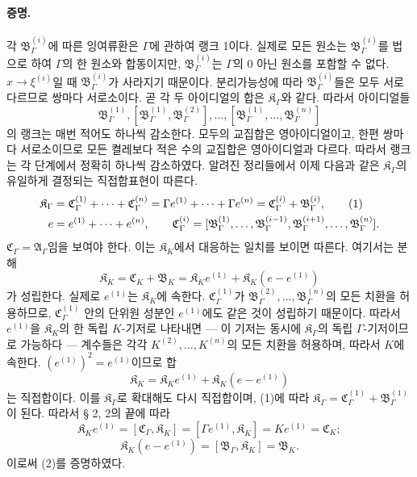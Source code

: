 \paragraph{증명.}
각 \(\mathfrak B_\Gamma^{(i)}\)에 따른 잉여류환은 \(\Gamma\)에 관하여 랭크 1이다. 실제로 모든 원소는 \(\mathfrak B_\Gamma^{(i)}\)를 법으로 하여 \(\Gamma\)의 한 원소와 합동이지만, \(\mathfrak B_\Gamma^{(i)}\)는 \(\Gamma\)의 0 아닌 원소를 포함할 수 없다. \(x\to\xi^{(i)}\)일 때 \(\mathfrak B_\Gamma^{(i)}\)가 사라지기 때문이다. 분리가능성에 따라 \(\mathfrak B_\Gamma^{(i)}\)들은 모두 서로 다르므로 쌍마다 서로소이다. 곧 각 두 아이디얼의 합은 \(\mathfrak K_\Gamma\)와 같다. 따라서 아이디얼들
\[
\mathfrak B_\Gamma^{(1)},
[\mathfrak B_\Gamma^{(1)},\mathfrak B_\Gamma^{(2)}],\ldots,
[\mathfrak B_\Gamma^{(1)},\ldots,\mathfrak B_\Gamma^{(n)}]
\]
의 랭크는 매번 적어도 하나씩 감소한다. 모두의 교집합은 영아이디얼이고, 한편 쌍마다 서로소이므로 모든 켤레보다 적은 수의 교집합은 영아이디얼과 다르다. 따라서 랭크는 각 단계에서 정확히 하나씩 감소하였다. 알려진 정리들에서 이제 다음과 같은 \(\mathfrak K_\Gamma\)의 유일하게 결정되는 직접합표현이 따른다.
\begin{align}
\mathfrak K_\Gamma
&=\mathfrak C_\Gamma^{(1)}+\cdots+\mathfrak C_\Gamma^{(n)}
=\Gamma e^{(1)}+\cdots+\Gamma e^{(n)}
=\mathfrak C_\Gamma^{(i)}+\mathfrak B_\Gamma^{(i)}, \tag{1}\\
e&=e^{(1)}+\cdots+e^{(n)},\qquad
\mathfrak C_\Gamma^{(i)}=
[\mathfrak B_\Gamma^{(1)},\ldots,\mathfrak B_\Gamma^{(i-1)},
\mathfrak B_\Gamma^{(i+1)},\ldots,\mathfrak B_\Gamma^{(n)}].\notag
\end{align}
\(\mathfrak C_\Gamma=\mathfrak A_\Gamma\)임을 보여야 한다. 이는 \(\mathfrak K_K\)에서 대응하는 일치를 보이면 따른다. 여기서는 분해
\begin{equation}
\mathfrak K_K=\mathfrak C_K+\mathfrak B_K
=\mathfrak K_K e^{(1)}+\mathfrak K_K(e-e^{(1)}) \tag{2}
\end{equation}
가 성립한다. 실제로 \(e^{(1)}\)는 \(\mathfrak K_K\)에 속한다. \(\mathfrak C_\Gamma^{(1)}\)가 \(\mathfrak B_\Gamma^{(2)},\ldots,\mathfrak B_\Gamma^{(n)}\)의 모든 치환을 허용하므로, \(\mathfrak C_\Gamma^{(1)}\) 안의 단위원 성분인 \(e^{(1)}\)에도 같은 것이 성립하기 때문이다. 따라서 \(e^{(1)}\)을 \(\mathfrak K_K\)의 한 독립 \(K\)-기저로 나타내면 --- 이 기저는 동시에 \(\mathfrak K_\Gamma\)의 독립 \(\Gamma\)-기저이므로 가능하다 --- 계수들은 각각 \(K^{(2)},\ldots,K^{(n)}\)의 모든 치환을 허용하며, 따라서 \(K\)에 속한다. \((e^{(1)})^2=e^{(1)}\)이므로 합
\[
\mathfrak K_K=\mathfrak K_K e^{(1)}+\mathfrak K_K(e-e^{(1)})
\]
는 직접합이다. 이를 \(\mathfrak K_\Gamma\)로 확대해도 다시 직접합이며, (1)에 따라 \(\mathfrak K_\Gamma=\mathfrak C_\Gamma^{(1)}+\mathfrak B_\Gamma^{(1)}\)이 된다. 따라서 § 2, 2의 끝에 따라
\[
\mathfrak K_K e^{(1)}=[\mathfrak C_\Gamma,\mathfrak K_K]
=[\Gamma e^{(1)},\mathfrak K_K]=Ke^{(1)}=\mathfrak C_K;
\]
\[
\mathfrak K_K(e-e^{(1)})=[\mathfrak B_\Gamma,\mathfrak K_K]=\mathfrak B_K.
\]
이로써 (2)를 증명하였다.

